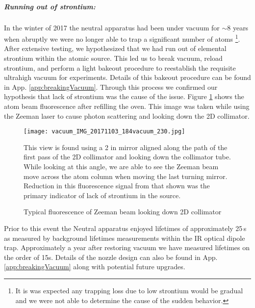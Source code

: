 \subparagraph{Running out of strontium:}
In the winter of 2017 the neutral apparatus had been under vacuum for $\sim$8 years when abruptly we were no longer able to trap a significant number of atoms \footnote{It is was expected any trapping loss due to low strontium would be gradual and we were not able to determine the cause of the sudden behavior.}.
After extensive testing, we hypothesized that we had run out of elemental strontium within the atomic source.
This led us to break vacuum, reload strontium, and perform a light bakeout procedure to reestablish the requisite ultrahigh vacuum for experiments.
Details of this bakeout procedure can be found in App. \ref{app:breakingVacuum}. 
Through this process we confirmed our hypothesis that lack of strontium was the cause of the issue. 
Figure \ref{fig:2d_coll_flourescence} shows the atom beam fluorescence after refilling the oven.
This image was taken while using the Zeeman laser to cause photon scattering and looking down the 2D collimator.
	\begin{figure}
		\centerline{
		\texttt{[image: vacuum\_IMG\_20171103\_184vacuum\_230.jpg]}}
		\caption{Typical fluorescence of Zeeman beam looking down 2D collimator}{This view is found using a 2 in mirror aligned along the path of the first pass of the 2D collimator and looking down the collimator tube. While looking at this angle, we are able to see the Zeeman beam move across the atom column when moving the last turning mirror. Reduction in this fluorescence signal from that shown was the primary indicator of lack of strontium in the source.}
		\label{fig:2d_coll_flourescence}
	\end{figure}  
Prior to this event the Neutral apparatus enjoyed lifetimes of approximately 25\,s as measured by background lifetimes measurements within the IR optical dipole trap. 
Approximately a year after restoring vacuum we have measured lifetimes on the order of 15s.
Details of the nozzle design can also be found in App. \ref{app:breakingVacuum} along with potential future upgrades.

